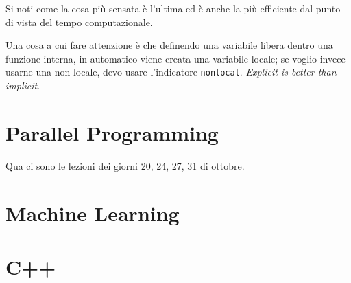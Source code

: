 \documentclass[10pt, a4paper, titlepage]{book}
\begin{document}
Si noti come la cosa più sensata è l'ultima ed è anche la più efficiente dal punto di vista del tempo computazionale.

Una cosa a cui fare attenzione è che definendo una variabile libera dentro una funzione interna, in automatico viene creata una variabile locale; se voglio invece usarne una non locale, devo usare l'indicatore \texttt{nonlocal}. \textit{Explicit is better than implicit}.


\chapter{Parallel Programming}

Qua ci sono le lezioni dei giorni 20, 24, 27, 31 di ottobre.


\chapter{Machine Learning}


\chapter{C++}
\end{document}
